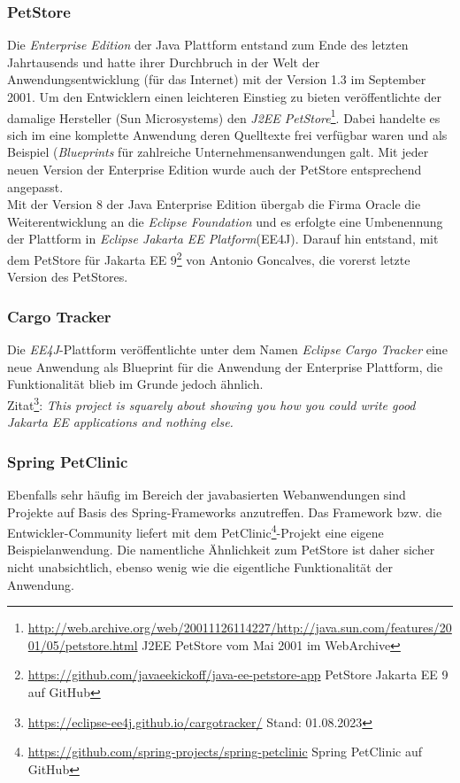 \subsubsection{PetStore}

Die \emph{Enterprise Edition} der Java Plattform entstand zum Ende des letzten Jahrtausends und hatte ihrer Durchbruch in der Welt der Anwendungsentwicklung (für das Internet) mit der Version 1.3 im September 2001. Um den Entwicklern einen leichteren Einstieg zu bieten veröffentlichte der damalige Hersteller (Sun Microsystems) den \emph{J2EE PetStore}\footnote{\url{http://web.archive.org/web/20011126114227/http://java.sun.com/features/2001/05/petstore.html} J2EE PetStore vom Mai 2001 im WebArchive}. Dabei handelte es sich im eine komplette Anwendung deren Quelltexte frei verfügbar waren und als Beispiel (\emph{Blueprints} für zahlreiche Unternehmensanwendungen galt. Mit jeder neuen Version der Enterprise Edition wurde auch der PetStore entsprechend angepasst.\\

Mit der Version 8 der Java Enterprise Edition übergab die Firma Oracle die Weiterentwicklung an die \emph{Eclipse Foundation} und es erfolgte eine Umbenennung der Plattform in \glqq\emph{Eclipse Jakarta EE Platform}\grqq{}(EE4J). Darauf hin entstand, mit dem PetStore für Jakarta EE 9\footnote{\url{https://github.com/javaeekickoff/java-ee-petstore-app} PetStore Jakarta EE 9 auf GitHub} von Antonio Goncalves, die vorerst letzte Version des PetStores. 


\subsubsection{Cargo Tracker}
Die \emph{EE4J}-Plattform veröffentlichte unter dem Namen \glqq\emph{Eclipse Cargo Tracker}\grqq{} eine neue Anwendung als Blueprint für die Anwendung der Enterprise Plattform, die Funktionalität blieb im Grunde jedoch ähnlich.\\

\textcolor{bhtGray}{ Zitat\footnote{\url{https://eclipse-ee4j.github.io/cargotracker/} Stand: 01.08.2023}:} \emph{This project is squarely about showing you how you could write good Jakarta EE applications and nothing else.}


\subsubsection{Spring PetClinic}
Ebenfalls sehr häufig im Bereich der javabasierten Webanwendungen sind Projekte auf Basis des Spring-Frameworks anzutreffen. Das Framework bzw. die Entwickler-Community liefert mit dem PetClinic\footnote{\url{https://github.com/spring-projects/spring-petclinic} Spring PetClinic auf GitHub}-Projekt eine eigene Beispielanwendung. Die namentliche Ähnlichkeit zum PetStore ist daher sicher nicht unabsichtlich, ebenso wenig wie die eigentliche Funktionalität der Anwendung. 


